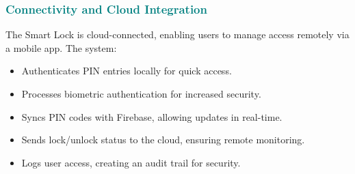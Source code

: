\subsubsection{\textcolor{teal}{Connectivity and Cloud Integration}}

The Smart Lock is cloud-connected, enabling users to manage access remotely via a mobile app. The system:
\begin{itemize}
    \item Authenticates PIN entries locally for quick access.
    \item Processes biometric authentication for increased security.
    \item Syncs PIN codes with Firebase, allowing updates in real-time.
    \item Sends lock/unlock status to the cloud, ensuring remote monitoring.
    \item Logs user access, creating an audit trail for security.
\end{itemize}

